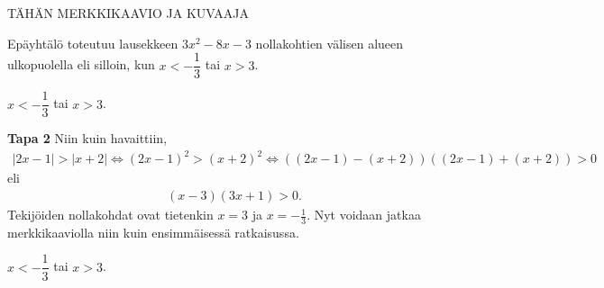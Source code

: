 \begin{esimerkki}
\begin{esimratk}
TÄHÄN MERKKIKAAVIO JA KUVAAJA

Epäyhtälö toteutuu lausekkeen $3x^2-8x-3$ nollakohtien välisen alueen ulkopuolella eli silloin, kun $x<-\dfrac{1}{3}$ tai $x>3$.
\end{esimratk}

\begin{esimvast}
$x<-\dfrac{1}{3}$ tai $x>3$.
\end{esimvast}

\begin{esimratk} \textbf{Tapa 2}
Niin kuin havaittiin,
\begin{align*}
|2x-1| > |x+2| \Leftrightarrow (2x-1)^2 > (x+2)^2 \Leftrightarrow ((2x-1)-(x+2))((2x-1)+(x+2)) > 0
\end{align*}
eli
\begin{align*}
(x-3)(3x+1)>0.
\end{align*}
Tekijöiden nollakohdat ovat tietenkin $x = 3$ ja $x = -\frac{1}{3}$. Nyt voidaan jatkaa merkkikaaviolla niin kuin ensimmäisessä ratkaisussa.
\end{esimratk}
\begin{esimvast}
$x<-\dfrac{1}{3}$ tai $x>3$.
\end{esimvast}
\end{esimerkki}

